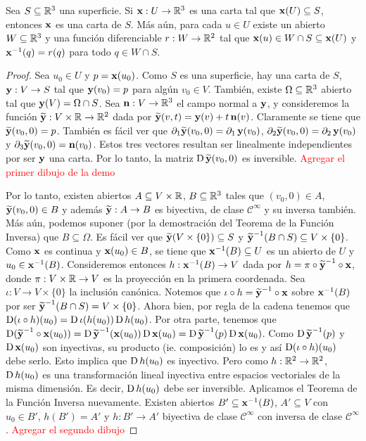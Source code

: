 \begin{prop}\label{prop::ensanchetecnico}
Sea $S\subseteq\RR^3$ una superficie. Si $\x:U\to\RR^3$ es una carta tal que $\x(U)\subseteq S$, entonces $\x$ es una carta de $S$. Más aún, para cada $u\in U$ existe un abierto $W\subseteq\RR^3$ y una función diferenciable $r:W\to\RR^2$ tal que $\x(u)\in W\cap S\subseteq\x(U)$ y $\x^{-1}(q)=r(q)$ para todo $q\in W\cap S$.
\begin{proof}
Sea $u_0\in U$ y $p=\x(u_0)$. Como $S$ es una superficie, hay una carta de $S$, $\y:V\to S$ tal que $\y(v_0)=p$ para algún $v_0\in V$. También, existe $\Omega\subseteq\RR^3$ abierto tal que $\y(V)=\Omega\cap S$. Sea $\n:V\to\RR^3$ el campo normal a $\y$, y consideremos la función $\widetilde{\y}:V\times\RR\to\RR^2$ dada por $\widetilde{\y}(v,t)=\y(v)+t\n(v)$. Claramente se tiene que $\widetilde{\y}(v_0,0)=p$. También es fácil ver que $\partial_1\widetilde{\y}(v_0,0)=\partial_1\y(v_0)$, $\partial_2\widetilde{\y}(v_0,0) = \partial_2\y(v_0)$ y $\partial_3\widetilde{\y}(v_0,0)=\n(v_0)$. Estos tres vectores resultan ser linealmente independientes por ser $\y$ una carta. Por lo tanto, la matriz $\D\widetilde{\y}(v_0,0)$ es inversible.
\textcolor{red}{Agregar el primer dibujo de la demo}

Por lo tanto, existen abiertos $A\subseteq V\times\RR$, $B\subseteq\RR^3$ tales que $(v_0,0)\in A$, $\widetilde{\y}(v_0,0)\in B$ y además $\widetilde{\y}:A\to B$ es biyectiva, de clase $\mathscr{C}^\infty$ y su inversa también. Más aún, podemos suponer (por la demostración del Teorema de la Función Inversa) que $B\subseteq\Omega$. Es fácil ver que $\widetilde{\y}(V\times\{0\}) \subseteq S$ y $\widetilde{\y}^{-1}(B\cap S) \subseteq V\times\{0\}$. Como $\x$ es continua y $\x(u_0)\in B$, se tiene que $\x^{-1}(B)\subseteq U$ es un abierto de $U$ y $u_0\in\x^{-1}(B)$. Consideremos entonces $h:\x^{-1}(B)\to V$ dada por $h=\pi\circ\widetilde{\y}^{-1}\circ\x$, donde $\pi:V\times\RR\to V$ es la proyección en la primera coordenada. Sea $\iota:V\to V\times\{0\}$ la inclusión canónica. Notemos que $\iota\circ h = \widetilde{\y}^{-1}\circ\x$ sobre $\x^{-1}(B)$ por ser $\widetilde{\y}^{-1}(B\cap S) = V\times\{0\}$. Ahora bien, por regla de la cadena tenemos que $\D(\iota\circ h)(u_0)=\D\iota(h(u_0))\D h(u_0)$. Por otra parte, tenemos que $\D(\widetilde{\y}^{-1}\circ\x(u_0))=\D\widetilde{\y}^{-1}(\x(u_0))\D\x(u_0) = \D\widetilde{\y}^{-1}(p)\D\x(u_0)$. Como $\D\widetilde{\y}^{-1}(p)$ y $\D\x(u_0)$  son inyectivas, su producto (ie. composición) lo es y así $\D(\iota\circ h)(u_0)$ debe serlo. Esto implica que $\D h(u_0)$ es inyectivo. Pero como $h:\RR^2\to\RR^2$, $\D h(u_0)$ es una transformación lineal inyectiva entre espacios vectoriales de la misma dimensión. Es decir, $\D h(u_0)$ debe ser inversible. Aplicamos el Teorema de la Función Inversa nuevamente. Existen abiertos $B'\subseteq\x^{-1}(B)$, $A'\subseteq V$ con $u_0\in B'$, $h(B')=A'$ y $h:B'\to A'$ biyectiva de clase $\mathscr{C}^\infty$ con inversa de clase $\mathscr{C}^\infty$. \textcolor{red}{Agregar el segundo dibujo}


\end{proof}
\end{prop}
